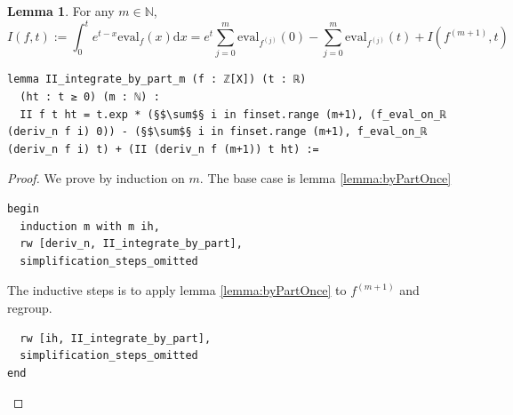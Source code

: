 \documentclass{report}
\theoremstyle{definition}
\newtheorem{lemma}{Lemma}[section]
\begin{document}
\begin{lemma}\label{lemma:byPartm}
For any $m\in\mathbb{N}$,
$$
I(f,t):=\int_0^t e^{t-x}\mathrm{eval}_f(x)\mathrm{d}x=e^t\sum_{j=0}^m\mathrm{eval}_{f^{(j)}}(0)-\sum_{j=0}^m\mathrm{eval}_{f^{(j)}}(t)+I(f^{(m+1)}, t)
$$
\begin{verbatim}
lemma II_integrate_by_part_m (f : ℤ[X]) (t : ℝ) 
  (ht : t ≥ 0) (m : ℕ) :
  II f t ht = t.exp * (§$\sum$§ i in finset.range (m+1), (f_eval_on_ℝ (deriv_n f i) 0)) - (§$\sum$§ i in finset.range (m+1), f_eval_on_ℝ (deriv_n f i) t) + (II (deriv_n f (m+1)) t ht) :=
\end{verbatim}
\end{lemma}

\begin{proof}
We prove by induction on $m$. The base case is lemma \ref{lemma:byPartOnce} 
\begin{verbatim}
begin
  induction m with m ih,
  rw [deriv_n, II_integrate_by_part],
  simplification_steps_omitted
\end{verbatim}
The inductive steps is to apply lemma \ref{lemma:byPartOnce} to $f^{(m+1)}$ and regroup.
\begin{verbatim}
  rw [ih, II_integrate_by_part],
  simplification_steps_omitted
end
\end{verbatim}
\end{proof}
\end{document}
